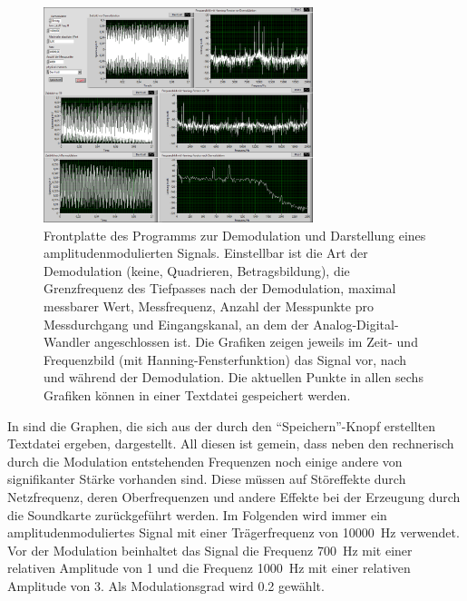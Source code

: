\documentclass[
a4paper,
12pt,
pagesize,
ngerman
]{scrartcl}
\begin{document}
	\begin{figure}[H]  
		\includegraphics[width=0.7\textwidth]{EIRE2018Dateien/Tag3/modifizierterOszi/Oszilloskop__modifiziertp}
		\centering
		\caption{
			Frontplatte des Programms zur Demodulation und Darstellung eines amplitudenmodulierten Signals.
			Einstellbar ist die Art der Demodulation (keine, Quadrieren, Betragsbildung), die Grenzfrequenz des Tiefpasses nach der Demodulation, maximal messbarer Wert, Messfrequenz, Anzahl der Messpunkte pro Messdurchgang und Eingangskanal, an dem der Analog-Digital-Wandler angeschlossen ist.
			Die Grafiken zeigen jeweils im Zeit- und Frequenzbild (mit Hanning-Fensterfunktion) das Signal vor, nach und während der Demodulation.
			Die aktuellen Punkte in allen sechs Grafiken können in einer Textdatei gespeichert werden.
		}
		\label{fig_tag3_am_demod_front}
		\centering
	\end{figure}

	In  sind die Graphen, die sich aus der durch den \enquote{Speichern}-Knopf erstellten Textdatei ergeben, dargestellt.
	All diesen ist gemein, dass neben den rechnerisch durch die Modulation entstehenden Frequenzen noch einige andere von signifikanter Stärke vorhanden sind.
	Diese müssen auf Störeffekte durch Netzfrequenz, deren Oberfrequenzen und andere Effekte bei der Erzeugung durch die Soundkarte zurückgeführt werden. %
	Im Folgenden wird immer ein amplitudenmoduliertes Signal mit einer Trägerfrequenz von \SI{10000}{\hertz} verwendet.
	Vor der Modulation beinhaltet das Signal die Frequenz \SI{700}{\hertz} mit einer relativen Amplitude von \num{1} und die Frequenz \SI{1000}{\hertz} mit einer relativen Amplitude von \num{3}. %
	Als Modulationsgrad wird \num{0,2} gewählt.
\end{document}
